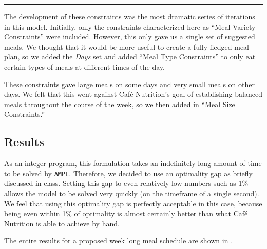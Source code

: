 \documentclass[twoside]{article}
\newcommand{\cn}{Caf\'e Nutrition\xspace}
\newcommand{\codeformat}[1]{\texttt{#1}}
\newcommand{\AMPL}{\codeformat{AMPL}\xspace}
\begin{document}
\begin{center}
    \rule{0.8\textwidth}{0.4pt}
\end{center}

The development of these constraints was the most dramatic series of iterations in this model. Initially, only the constraints characterized here as ``Meal Variety Constraints'' were included. However, this only gave us a single set of suggested meals. We thought that it would be more useful to create a fully fledged meal plan, so we added the \emph{Days} set and added ``Meal Type Constraints'' to only eat certain types of meals at different times of the day.

These constraints gave large meals on some days and very small meals on other days. We felt that this went against \cn's goal of establishing balanced meals throughout the course of the week, so we then added in ``Meal Size Constraints.''

\subsection{Results}
As an integer program, this formulation takes an indefinitely long amount of time to be solved by \AMPL. Therefore, we decided to use an optimality gap as briefly discussed in class. Setting this gap to even relatively low numbers such as 1\% allows the model to be solved very quickly (on the timeframe of a single second). We feel that using this optimality gap is perfectly acceptable in this case, because being even within 1\% of optimality is almost certainly better than what \cn is able to achieve by hand.

The entire results for a proposed week long meal schedule are shown in .
\end{document}
